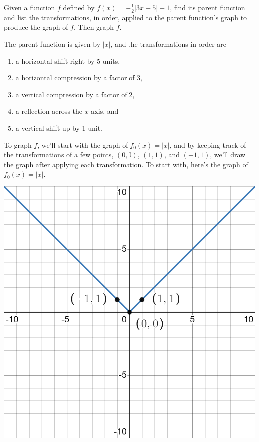 \documentclass[handout, noauthor, nooutcomes]{ximera}
\begin{document}
\begin{example}
Given a function $f$ defined by $f(x) = -\frac{1}{2}|3x - 5| + 1$, find its parent function and list the transformations, in order, applied to the parent function's graph to produce the graph of $f$. Then graph $f$.
\begin{explanation}
The parent function is given by $|x|$, and the transformations in order are 
\begin{enumerate}
\item a horizontal shift right by 5 units,
\item a horizontal compression by a factor of 3,
\item a vertical compression by a factor of 2,
\item a reflection across the $x$-axis, and
\item a vertical shift up by 1 unit.
\end{enumerate}

To graph $f$, we'll start with the graph of $f_0(x) = |x|$, and by keeping track of the transformations of a few points, $(0, 0)$, $(1, 1)$, and $(-1, 1)$,  we'll draw the graph after applying each transformation. To start with, here's the graph of $f_0(x) = |x|$. 

\includegraphics[width=1\linewidth]{images/exgraph1.png}


\end{explanation}
\end{example}
\end{document}

